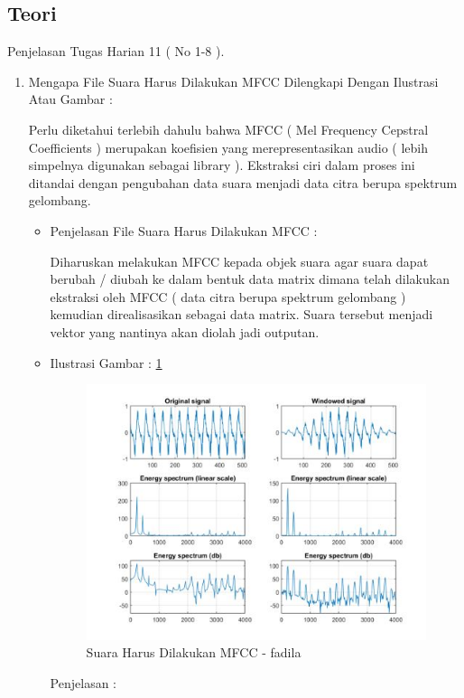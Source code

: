\subsection{Teori}
Penjelasan Tugas Harian 11 ( No 1-8 ).
\begin{enumerate}
\item Mengapa File Suara Harus Dilakukan MFCC Dilengkapi Dengan Ilustrasi Atau Gambar :
\par Perlu diketahui terlebih dahulu bahwa MFCC ( Mel Frequency Cepstral Coefficients ) merupakan koefisien yang merepresentasikan audio ( lebih simpelnya digunakan sebagai library ). Ekstraksi ciri dalam proses ini ditandai dengan pengubahan data suara menjadi data citra berupa spektrum gelombang.
\begin{itemize}
\item Penjelasan File Suara Harus Dilakukan MFCC : 
\par Diharuskan melakukan MFCC kepada objek suara agar suara dapat berubah / diubah ke dalam bentuk data matrix dimana telah dilakukan ekstraksi oleh MFCC ( data citra berupa spektrum gelombang ) kemudian direalisasikan sebagai data matrix. Suara tersebut menjadi vektor yang nantinya akan diolah jadi outputan.
\par
\item Ilustrasi Gambar : \ref{suara-mfcc-fadila}
\par
\begin{figure}[!hbtp]
\centering
\includegraphics[scale=0.2]{figures/suara-mfcc-fadila.jpg}
\caption{Suara Harus Dilakukan MFCC - fadila}
\label{suara-mfcc-fadila}
\end{figure}
\par
\par Penjelasan :

\end{itemize}
\end{enumerate}
